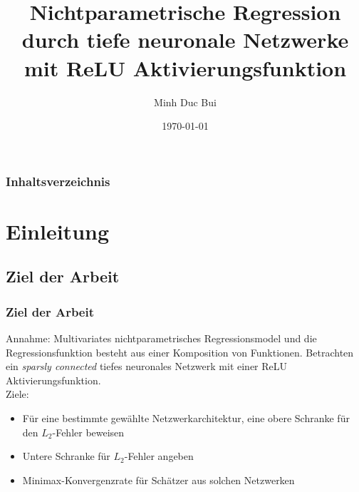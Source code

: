 \documentclass[hyperref={pdfpagelabels=false}]{beamer}
\title{Nichtparametrische Regression durch tiefe neuronale Netzwerke mit ReLU Aktivierungsfunktion }
\author{Minh Duc Bui}
\date{\today}
\begin{document}
\newcommand{\E}{\mbox{I\negthinspace E}}
\newcommand{\RN}[1]{\uppercase\expandafter{\romannumeral#1}}
\DeclarePairedDelimiter{\abs}{\lvert}{\rvert} 
\DeclarePairedDelimiter{\norm}{\lVert}{\rVert}
\newcommand{\argmin}{arg\,min}




\begin{frame}
\titlepage
\end{frame} 

\begin{frame}[allowframebreaks]
\frametitle{Inhaltsverzeichnis}
\tableofcontents
\end{frame} 


\section{Einleitung} 


\subsection{Ziel der Arbeit}
\begin{frame} 
\frametitle{Ziel der Arbeit}  
Annahme: Multivariates nichtparametrisches Regressionsmodel und  die Regressionsfunktion besteht aus einer Komposition von Funktionen. Betrachten ein \textit{sparsly connected} tiefes neuronales Netzwerk mit einer ReLU Aktivierungsfunktion. \\Ziele:
\begin{itemize}
\item Für eine bestimmte gewählte Netzwerkarchitektur, eine obere Schranke für den $L_2$-Fehler beweisen
\item Untere Schranke für $L_2$-Fehler angeben
\item Minimax-Konvergenzrate für Schätzer aus solchen Netzwerken
\end{itemize}
\end{frame}
\end{document}
